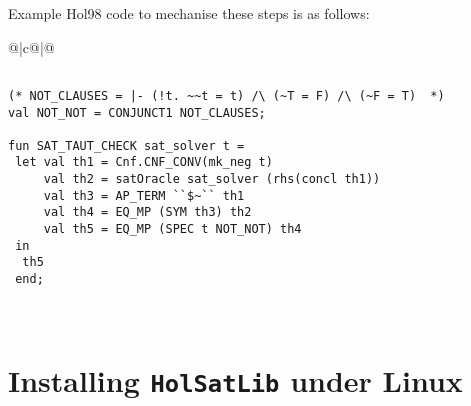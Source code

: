 \documentclass[12pt]{article}
\makeatletter
\newcommand\Hol{Hol98\xspace}
\newlength{\hsbw}
\newcommand\MLSpacing{13pt}
\newenvironment{session}{\begin{flushleft}
 \begin{tabular}{@{}|c@{}|@{}}\hline 
 \begin{minipage}[b]{\hsbw}
 \begingroup\small\baselineskip\MLSpacing}{\endgroup\end{minipage}\\ \hline 
 \end{tabular}
 \end{flushleft}}
\makeatother
\begin{document}
Example \Hol code to mechanise these steps is as follows:

\begin{session}\begin{verbatim}

(* NOT_CLAUSES = |- (!t. ~~t = t) /\ (~T = F) /\ (~F = T)  *)
val NOT_NOT = CONJUNCT1 NOT_CLAUSES;

fun SAT_TAUT_CHECK sat_solver t =
 let val th1 = Cnf.CNF_CONV(mk_neg t)
     val th2 = satOracle sat_solver (rhs(concl th1))
     val th3 = AP_TERM ``$~`` th1
     val th4 = EQ_MP (SYM th3) th2
     val th5 = EQ_MP (SPEC t NOT_NOT) th4
 in
  th5
 end;

\end{verbatim}\end{session}

\section{Installing {\tt HolSatLib} under Linux}\label{install}
\end{document}
